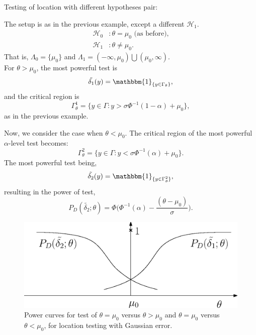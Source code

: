 \documentclass[a4paper,english,12pt]{article}
\begin{document}
\begin{exmp}{Testing of location with different hypotheses pair:}
\par The setup is as in the previous example, except a different $\mathcal{H}_1$.
\begin{align*}
\mathcal{H}_0 &: \theta = \mu_0  \text{   (as before),}\\
\mathcal{H}_1 &: \theta \neq \mu_0.
\end{align*}
That is, $\Lambda_0 = \{\mu_0\}$ and $\Lambda_1 = (-\infty, \mu_0) \bigcup (\mu_0, \infty)$.\\
For $\theta > \mu_0$, the most powerful test is
\begin{equation}
\tilde{\delta_1}(y) = \mathbbm{1}_{\{y \in \Gamma_\theta\}},
\end{equation}
and the critical region is
\begin{equation}
\Gamma_\theta^1 = \{y \in \Gamma: y > \sigma\Phi^{-1}(1 - \alpha) + \mu_0\},
\end{equation}
as in the previous example.
\par Now, we consider the case when $\theta < \mu_0$. The critical region of the most powerful $\alpha$-level test becomes:
\begin{equation}
\Gamma_\theta^2 = \{y \in \Gamma: y < \sigma\Phi^{-1}(\alpha) + \mu_0\}.
\end{equation}
The most powerful test being,
\begin{equation}
\tilde{\delta_2}(y) = \mathbbm{1}_{\{y \in \Gamma_\theta^2\}},
\end{equation}
resulting in the power of test,
\begin{equation}
P_D(\tilde{\delta_2}; \theta) = \Phi\Big(\Phi^{-1}(\alpha) - \dfrac{(\theta - \mu_0)}{\sigma}\Big).
\end{equation}
\begin{figure}
\centering
\includegraphics[scale=0.6]{Figures/PD.eps}
\caption{Power curves for test of $\theta = \mu_0$ versus $\theta > \mu_0$ and $\theta = \mu_0$ versus $\theta < \mu_0$, for location testing with Gaussian error.}
\label{fig: example 1.5 and 1.6}
\end{figure}
\end{exmp}
\end{document}
